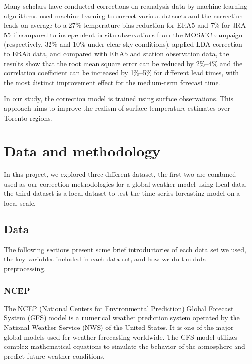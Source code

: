 \documentclass[12pt]{article}
\begin{document}
Many scholars have conducted corrections on reanalysis data by machine learning algorithms. \cite{Zampieri2023} used machine learning to correct various datasets and the correction leads on average to a 27\% temperature bias reduction for ERA5 and 7\% for JRA-55 if compared to independent in situ observations from the MOSAiC campaign (respectively, 32\% and 10\% under clear-sky conditions). \cite{Hou2022} applied LDA correction to ERA5 data, and compared with ERA5 and station observation data, the results show that the root mean square error can be reduced by 2\%–4\% and the correlation coefficient can be increased by 1\%–5\% for different lead times, with the most distinct improvement effect for the medium-term forecast time.

In our study, the correction model is trained using surface observations. This approach aims to improve the realism of surface temperature estimates over Toronto regions. 

\section{Data and methodology}

In this project, we explored three different dataset, the first two are combined used as our correction methodologies for a global weather model using local data, the third dataset is a local dataset to test the time series forcasting model on a local scale.

\subsection{Data}

The following sections present some brief introductories of each data set we used, the key variables included in each data set, and how we do the data preprocessing.

\subsubsection{NCEP}

The NCEP (National Centers for Environmental Prediction) Global Forecast System (GFS) model is a numerical weather prediction system operated by the National Weather Service (NWS) of the United States. It is one of the major global models used for weather forecasting worldwide. The GFS model utilizes complex mathematical equations to simulate the behavior of the atmosphere and predict future weather conditions.
\end{document}
